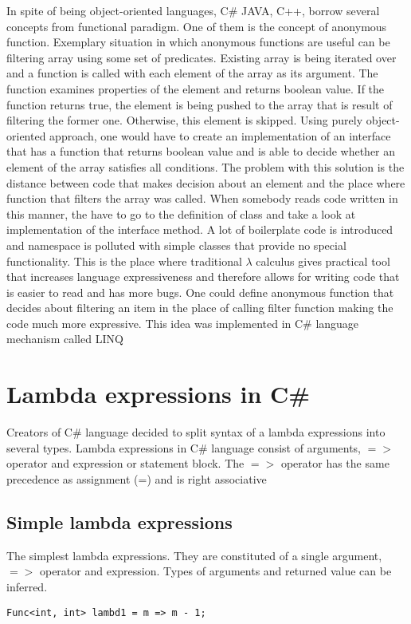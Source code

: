 \documentclass[]{report}
\begin{document}
    In spite of being object-oriented languages, C\# JAVA, C++, borrow several concepts from functional paradigm. One of them is the concept of anonymous function. Exemplary situation in which anonymous functions are useful can be filtering array using some set of predicates. Existing array is being iterated over and a function is called with each element of the array as its argument. The function examines properties of the element and returns boolean value. If the function returns true, the element is being pushed to the array that is result of filtering the former one. Otherwise, this element is skipped. 
    Using purely object-oriented approach, one would have to create an implementation of an interface that has a function that returns boolean value and is able to decide whether an element of the array satisfies all conditions. The problem with this solution is the distance between code that makes decision about an element and the place where function that filters the array was called. When somebody reads code written in this manner, the have to go to the definition of class and take a look at implementation of the interface method. A lot of boilerplate code is introduced and namespace is polluted with simple classes that provide no special functionality.
    This is the place where traditional $\lambda$ calculus gives practical tool that increases language expressiveness and therefore allows for writing code that is easier to read and has more bugs. One could define anonymous function that decides about filtering an item in the place of calling filter function making the code much more expressive. This idea was implemented in C\# language mechanism called LINQ 
    
    \section{Lambda expressions in C\#}\label{lambdatypes}
    Creators of C\# language decided to split syntax of a lambda expressions into several types.
    Lambda expressions in C\# language consist of arguments, $=>$ operator and expression or statement block.
    The $=>$ operator has the same precedence as assignment (=) and is right associative \cite{csharplambdasyntax}
    
    \subsection{Simple lambda expressions}
    The simplest lambda expressions. They are constituted of a single argument, $=>$ operator and expression. Types of arguments and returned value can be inferred. 
    \begin{lstlisting}[style=sharpc, caption=This lambda has single integer argument m and returns an integer m - 1]
    Func<int, int> lambd1 = m => m - 1;
    \end{lstlisting}
\end{document}
